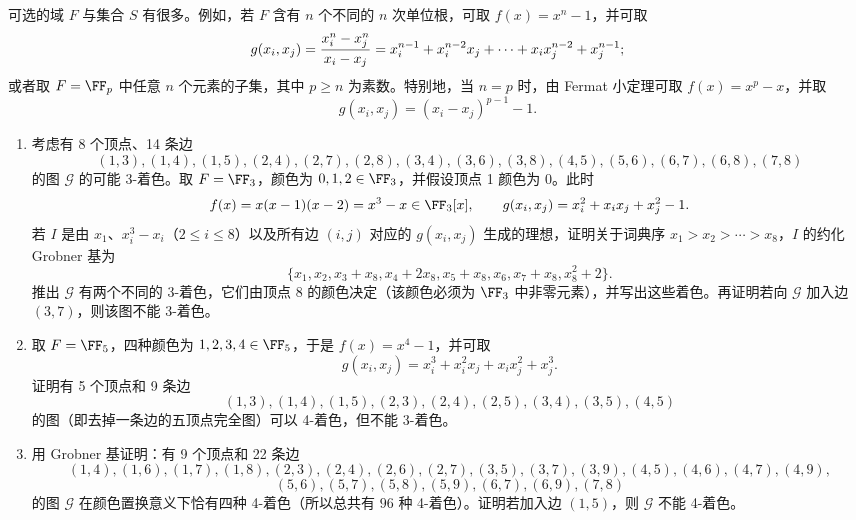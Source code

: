 \begin{enumerate}[label=\arabic*.]
	可选的域 $F$ 与集合 $S$ 有很多。例如，若 $F$ 含有 $n$ 个不同的 $n$ 次单位根，可取 $f(x)=x^n-1$，并可取
	\[
	g(x_i,x_j)={x_i^n-x_j^n\over x_i-x_j}
	=x_i^{n-1}+x_i^{n-2}x_j+\cdots+x_i x_j^{n-2}+x_j^{n-1};
	\]
	或者取 $F=\FF_p$ 中任意 $n$ 个元素的子集，其中 $p\geq n$ 为素数。特别地，当 $n=p$ 时，由 Fermat 小定理可取 $f(x)=x^p-x$，并取
	\[
	g(x_i,x_j)=(x_i-x_j)^{p-1}-1.
	\]
	\begin{enumerate}[label=(\alph*)]
		\item 考虑有 8 个顶点、14 条边
		\[
		(1,3),(1,4),(1,5),(2,4),(2,7),(2,8),(3,4),(3,6),(3,8),(4,5),(5,6),(6,7),(6,8),(7,8)
		\]
		的图 $\mathcal G$ 的可能 3-着色。取 $F=\FF_3$，颜色为 $0,1,2\in\FF_3$，并假设顶点 1 颜色为 $0$。此时
		\[
		f(x)=x(x-1)(x-2)=x^3-x\in\FF_3[x],
		\qquad g(x_i,x_j)=x_i^2+x_i x_j+x_j^2-1.
		\]
		若 $I$ 是由 $x_1$、$x_i^3-x_i$（$2\leq i\leq8$）以及所有边 $(i,j)$ 对应的 $g(x_i,x_j)$ 生成的理想，证明关于词典序 $x_1>x_2>\cdots>x_8$，$I$ 的约化 Grobner 基为
		\[
		\{x_1,
		x_2,
		x_3+x_8,
		x_4+2x_8,
		x_5+x_8,
		x_6,
		x_7+x_8,
		x_8^2+2\}.
		\]
		推出 $\mathcal G$ 有两个不同的 3-着色，它们由顶点 8 的颜色决定（该颜色必须为 $\FF_3$ 中非零元素），并写出这些着色。再证明若向 $\mathcal G$ 加入边 $(3,7)$，则该图不能 3-着色。
		\item 取 $F=\FF_5$，四种颜色为 $1,2,3,4\in\FF_5$，于是 $f(x)=x^4-1$，并可取
		\[
		g(x_i,x_j)=x_i^3+x_i^2x_j+x_i x_j^2+x_j^3.
		\]
		证明有 5 个顶点和 9 条边
		\[
		(1,3),(1,4),(1,5),(2,3),(2,4),(2,5),(3,4),(3,5),(4,5)
		\]
		的图（即去掉一条边的五顶点完全图）可以 4-着色，但不能 3-着色。
		\item 用 Grobner 基证明：有 9 个顶点和 22 条边
		\[
		(1,4),(1,6),(1,7),(1,8),(2,3),(2,4),(2,6),(2,7),(3,5),(3,7),(3,9),(4,5),(4,6),(4,7),(4,9),
		\]
		\[
		(5,6),(5,7),(5,8),(5,9),(6,7),(6,9),(7,8)
		\]
		的图 $\mathcal G$ 在颜色置换意义下恰有四种 4-着色（所以总共有 $96$ 种 4-着色）。证明若加入边 $(1,5)$，则 $\mathcal G$ 不能 4-着色。
	\end{enumerate}
\end{enumerate}
